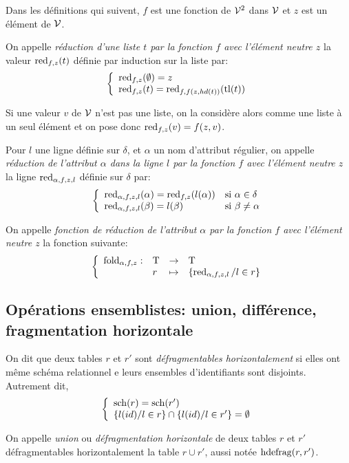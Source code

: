 Dans les définitions qui suivent, $f$ est une fonction de $\mathcal{V}^2$ dans $\mathcal{V}$
et $z$ est un élément de $\mathcal{V}$.

\begin{defi}
	On appelle
	\emph{réduction d'une liste $t$ par la fonction $f$ avec l'élément neutre $z$}
	la valeur $\operatorname{red}_{f, z}(t)$ définie par induction sur la liste par:
	$$
	\left\lbrace
	\begin{array}{l}
	\operatorname{red}_{f,z}(\emptyset) = z \\
	\operatorname{red}_{f,z}(t) = \operatorname{red}_{f , f(z, hd(t))}(\operatorname{tl}(t))
	\end{array}
	\right.
	$$
	
	Si une valeur $v$ de $\mathcal{V}$ n'est pas une liste,
	on la considère alors comme une liste à un seul
	élément et on pose donc $\operatorname{red}_{f,z}(v) = f(z,v)$.
\end{defi}

\begin{defi}
	Pour $l$ une ligne définie sur $\delta$,
	et $\alpha$ un nom d'attribut régulier,
	on appelle
	\emph{réduction de l'attribut $\alpha$ dans la ligne $l$ 
		par la fonction $f$ avec l'élément neutre $z$}
	la ligne $\operatorname{red}_{\alpha, f, z, l}$ définie sur $\delta$ par:
	$$
	\left\lbrace
	\begin{array}{ll}
	\operatorname{red}_{\alpha, f, z, l}(\alpha) = \operatorname{red}_{f,z}(l(\alpha)) & \text{si $\alpha \in \delta$}\\
	\operatorname{red}_{\alpha, f, z, l}(\beta) = l(\beta) & \text{si $\beta \neq \alpha$}
	\end{array}
	\right.
	$$
\end{defi}

\begin{defi}
	On appelle \emph{fonction de réduction de l'attribut $\alpha$
		par la fonction $f$ avec l'élément neutre $z$} la fonction suivante:
	$$
	\left\lbrace
	\begin{array}{llcl}
	\operatorname{fold}_{\alpha, f, z} : & \operatorname{T} & \rightarrow & \operatorname{T} \\
				& r 	& \mapsto & \{ \operatorname{red}_{\alpha, f, z, l} / l\in r \}
	\end{array}
	\right.
	$$
\end{defi}

\subsection*{Opérations ensemblistes: union, différence, fragmentation horizontale}
\begin{defi}
	On dit que deux tables $r$ et $r'$ sont \emph{défragmentables horizontalement}
	si elles ont  même schéma relationnel
	e leurs ensembles d'identifiants sont disjoints.
	Autrement dit,
	$$
	\left\lbrace
	\begin{array}{l}
	\operatorname{sch}(r) =  \operatorname{sch}(r') \\
	\{ l(id) / l \in r \} \cap \{ l(id) / l \in r' \} = \emptyset
	\end{array}
	\right.
	$$
	
	On appelle \emph{union} ou \emph{défragmentation horizontale}
	de deux tables $r$ et $r'$ défragmentables horizontalement
	la table $r \cup r'$, aussi notée $\operatorname{hdefrag}(r, r')$.
\end{defi}

